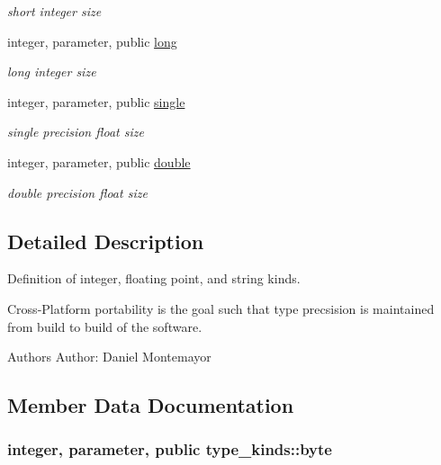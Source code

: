 \begin{DoxyCompactItemize}
\begin{DoxyCompactList}\small\item\em short integer size \end{DoxyCompactList}\item 
integer, parameter, public \hyperlink{classtype__kinds_a14af3c9d56db49c61252b056506a584a}{long}
\begin{DoxyCompactList}\small\item\em long integer size \end{DoxyCompactList}\item 
integer, parameter, public \hyperlink{classtype__kinds_a1752925d569776fd4a88872a620ed1d0}{single}
\begin{DoxyCompactList}\small\item\em single precision float size \end{DoxyCompactList}\item 
integer, parameter, public \hyperlink{classtype__kinds_a34b12277eb02d1bbaaaae83e033d9890}{double}
\begin{DoxyCompactList}\small\item\em double precision float size \end{DoxyCompactList}\end{DoxyCompactItemize}


\subsection{Detailed Description}
Definition of integer, floating point, and string kinds. 

Cross-\/\-Platform portability is the goal such that type precsision is maintained from build to build of the software. \begin{DoxyAuthor}{Authors}
Author\-: Daniel Montemayor 
\end{DoxyAuthor}


\subsection{Member Data Documentation}
\hypertarget{classtype__kinds_a13366a08a0935a72c203e1b880b4d49e}{
\subsubsection[{byte}]{\setlength{\rightskip}{0pt plus 5cm}integer, parameter, public type\-\_\-kinds\-::byte}}\label{classtype__kinds_a13366a08a0935a72c203e1b880b4d49e}


